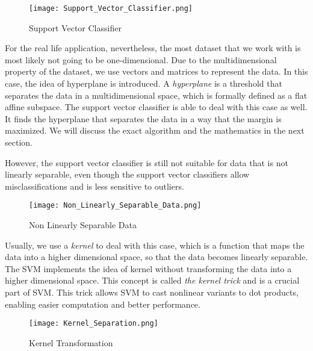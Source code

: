 \begin{figure}[h]%
    \begin{center}%
        \texttt{[image: Support\_Vector\_Classifier.png]}%
        \caption{Support Vector Classifier}\label{fig:}%
    \end{center}%
\end{figure}

For the real life application, nevertheless, the most dataset that we work with is 
most likely not going to be one-dimensional. Due to the multidimensional property of the dataset,
we use vectors and matrices 
to represent the data. In this case,
the idea of hyperplane is introduced. A \emph{hyperplane} is a threshold that separates the data in a multidimensional space,
which is formally defined as a flat affine subspace.\cite{R9} The support vector classifier is able to deal with this case as well.
It finds the hyperplane that separates the data in a way that the margin is maximized. We will discuss the exact algorithm and the
mathematics in the next section.

However, the support vector classifier is still not suitable for data that is not linearly separable, even though 
the support vector classifiers allow misclassifications and is less sensitive to outliers.
\begin{figure}[h]%
    \begin{center}%
        \texttt{[image: Non\_Linearly\_Separable\_Data.png]}%
        \caption{Non Linearly Separable Data}\label{fig:}%
    \end{center}%
\end{figure}

Usually, we use a \emph{kernel} to deal 
with this case, which is a function that maps the data into a higher dimensional space, so that the data becomes linearly
separable. The SVM implements the idea of kernel without transforming the data into a higher dimensional space. This concept is 
called \emph{the kernel trick} and is a crucial part of SVM. This trick allows SVM to cast nonlinear variants to dot products,
enabling easier computation and better performance. \cite{Kernel2}
\begin{figure}[h]%
    \begin{center}%
        \texttt{[image: Kernel\_Separation.png]}%
        \caption{Kernel Transformation}\label{fig:}%
    \end{center}%
\end{figure}
